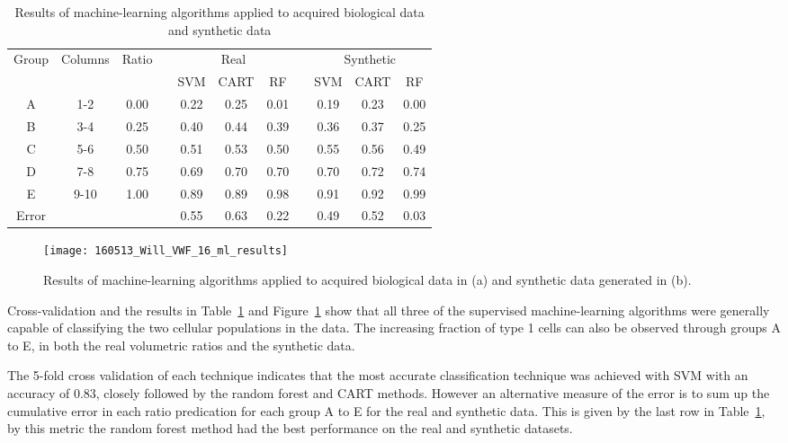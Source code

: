 \begin{table}[htbp!]
\centering
\caption[Mixed ratios cell classification machine learning performance]{Results of machine-learning algorithms applied to acquired biological data and synthetic data}
\label{table:endothelial_morphometry:cell_classification_performance}
\begin{tabular}{c c c c c c c c c c c}
\toprule
\multirow{2}{*}{Group} & \multirow{2}{*}{Columns} & \multirow{2}{*}{Ratio} & & \multicolumn{3}{c}{Real} & & \multicolumn{3}{c}{Synthetic}\\
\cmidrule{5-7}
\cmidrule{9-11}
	& & & & SVM & CART & RF & & SVM & CART & RF\\
\midrule
	A & 1-2 & 0.00 & & 0.22 & 0.25 & 0.01 & & 0.19 & 0.23 & 0.00 \\
	B & 3-4 & 0.25 & & 0.40 & 0.44 & 0.39 & & 0.36 & 0.37 & 0.25 \\
	C & 5-6 & 0.50 & & 0.51 & 0.53 & 0.50 & & 0.55 & 0.56 & 0.49 \\
	D & 7-8 & 0.75 & & 0.69 & 0.70 & 0.70 & & 0.70 & 0.72 & 0.74 \\
	E & 9-10 &1.00 & & 0.89 & 0.89 & 0.98 & & 0.91 & 0.92 & 0.99 \\
\midrule
	Error & & & & 0.55 & 0.63 & 0.22 & & 0.49 & 0.52 & 0.03 \\
\bottomrule
\end{tabular}
\end{table}

\begin{figure}[htbp!]
	\centering
	\texttt{[image: 160513\_Will\_VWF\_16\_ml\_results]} 
	\caption{Results of machine-learning algorithms applied to acquired biological data in (a) and synthetic data generated in (b).}
\label{figure:endothelial_morphometry:cell_classification_performance}
\end{figure}

Cross-validation and the results in Table~\ref{table:endothelial_morphometry:cell_classification_performance} and Figure~\ref{figure:endothelial_morphometry:cell_classification_performance} show that all three of the supervised machine-learning algorithms were generally capable of classifying the two cellular populations in the data. The increasing fraction of type 1 cells can also be observed through groups A to E, in both the real volumetric ratios and the synthetic data.

The 5-fold cross validation of each technique indicates that the most accurate classification technique was achieved with SVM with an accuracy of 0.83, closely followed by the random forest and CART methods. However an alternative measure of the error is to sum up the cumulative error in each ratio predication for each group A to E for the real and synthetic data. This is given by the last row in Table~\ref{table:endothelial_morphometry:cell_classification_performance}, by this metric the random forest method had the best performance on the real and synthetic datasets.

